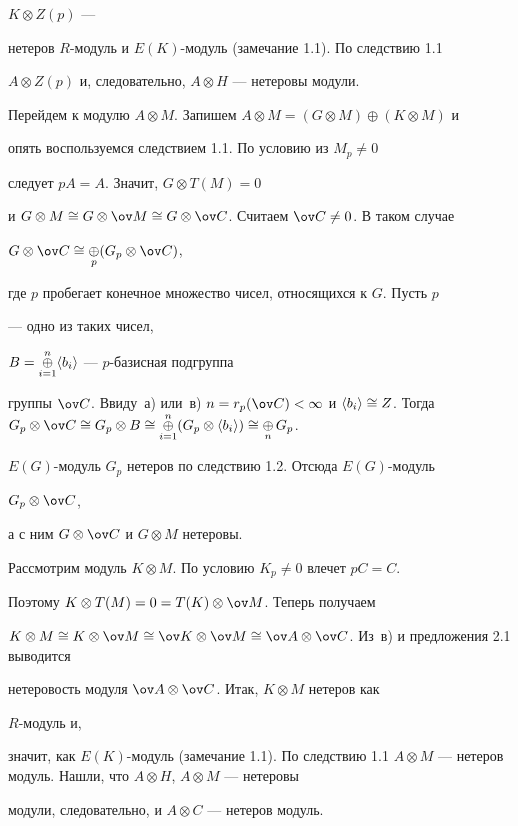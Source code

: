 \begin{pf}
$K\otimes Z(p)$ --- 


нетеров $R$-модуль и $E(K)$-модуль (замечание 1.1). По следствию 1.1\; 


$A\otimes Z(p)$ и, следовательно, $A\otimes H$ --- нетеровы модули. 


 


Перейдем к модулю $A\otimes M$. Запишем $A\otimes M=(G\otimes 


M)\oplus(K\otimes M)$ и 


опять воспользуемся следствием 1.1. По условию из $M_p\ne0$ 


следует $pA=A$. Значит, $G\otimes T(M)=0$


и $G\otimes M\cong G\otimes\ov M\cong 


G\otimes\ov C$. Считаем $\ov C\ne0$. В таком случае 


$G\otimes\ov C\cong\mathop{\oplus}\limits_{p}(G_p\otimes\ov C)$, 


где $p$ пробегает конечное множество чисел, относящихся к $G$. Пусть $p$ 


--- одно из таких чисел, 


$B=\mathop{\oplus}\limits^n_{i=1}\langle b_i\rangle$ --- $p$-базисная подгруппа 


группы $\ov C$. Ввиду~а) или~в) $n=r_p(\ov C)<\infty$ и $\la b_i\ra\cong 


Z$. Тогда $G_p\otimes\ov C\cong G_p\otimes B\cong 


\mathop{\oplus}\limits^n_{i=1}(G_p\otimes\la b_i\ra)\cong 


\mathop{\oplus}\limits_{n}G_p$.\; 


$E(G)$-модуль $G_p$ нетеров по следствию 1.2. Отсюда $E(G)$-модуль 


$G_p\otimes\ov C$, 


а с ним $G\otimes\ov C$ и $G\otimes M$ нетеровы. 


 


Рассмотрим модуль $K\otimes M$. По условию $K_p\ne0$ влечет $p C=C$. 


Поэтому $K\otimes T(M)=0=T(K)\otimes\ov M$. Теперь получаем 


$K\otimes M\cong K\otimes\ov M\cong\ov K\otimes\ov M\cong\ov A\otimes\ov 


C$. Из~в) и предложения 2.1 выводится 


нетеровость модуля $\ov A\otimes\ov C$. Итак, $K\otimes M$ нетеров как 


$R$-модуль и, 


значит, как $E(K)$-модуль (замечание 1.1). По следствию 1.1\; $A\otimes 


M$ --- нетеров модуль. Нашли, что $A\otimes H$, $A\otimes M$ --- нетеровы 


модули, следовательно, и $A\otimes C$ --- нетеров модуль. 


\end{pf} 



